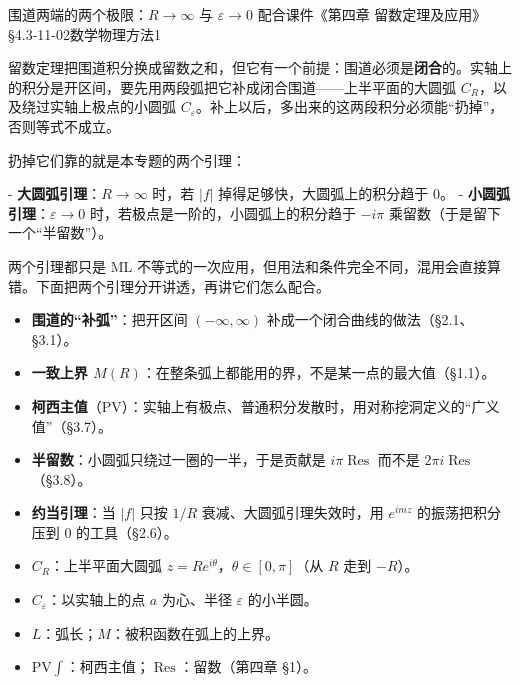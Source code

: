 \documentclass[11pt]{ctexart}
\let\origsubhdr\subhdr
\renewcommand{\subhdr}[1]{\par\needspace{4\baselineskip}\origsubhdr{#1}}
\let\orighdr\hdr
\renewcommand{\hdr}[2]{\par\orighdr{#1}{#2}}
\begin{document}
{围道两端的两个极限：$R\to\infty$ 与 $\varepsilon\to0$}
{配合课件《第四章 留数定理及应用》§4.3-11-02\quad 数学物理方法1}


留数定理把围道积分换成留数之和，但它有一个前提：围道必须是\textbf{闭合}的。实轴上的积分是开区间，要先用两段弧把它补成闭合围道——上半平面的大圆弧 $C_R$，以及绕过实轴上极点的小圆弧 $C_\varepsilon$。补上以后，多出来的这两段积分必须能“扔掉”，否则等式不成立。

扔掉它们靠的就是本专题的两个引理：

- \textbf{大圆弧引理}：$R\to\infty$ 时，若 $|f|$ 掉得足够快，大圆弧上的积分趋于 0。
- \textbf{小圆弧引理}：$\varepsilon\to0$ 时，若极点是一阶的，小圆弧上的积分趋于 $-i\pi$ 乘留数（于是留下一个“半留数”）。

两个引理都只是 ML 不等式的一次应用，但用法和条件完全不同，混用会直接算错。下面把两个引理分开讲透，再讲它们怎么配合。


\begin{itemize}
\item \textbf{围道的“补弧”}：把开区间 $(-\infty,\infty)$ 补成一个闭合曲线的做法（§2.1、§3.1）。
\item \textbf{一致上界 $M(R)$}：在整条弧上都能用的界，不是某一点的最大值（§1.1）。
\item \textbf{柯西主值}（$\mathrm{PV}$）：实轴上有极点、普通积分发散时，用对称挖洞定义的“广义值”（§3.7）。
\item \textbf{半留数}：小圆弧只绕过一圈的一半，于是贡献是 $i\pi\operatorname{Res}$ 而不是 $2\pi i\operatorname{Res}$（§3.8）。
\item \textbf{约当引理}：当 $|f|$ 只按 $1/R$ 衰减、大圆弧引理失效时，用 $e^{imz}$ 的振荡把积分压到 0 的工具（§2.6）。
\end{itemize}


\begin{itemize}
\item $C_R$：上半平面大圆弧 $z=Re^{i\theta}$，$\theta\in[0,\pi]$（从 $R$ 走到 $-R$）。
\item $C_\varepsilon$：以实轴上的点 $a$ 为心、半径 $\varepsilon$ 的小半圆。
\item $L$：弧长；$M$：被积函数在弧上的上界。
\item $\mathrm{PV}\!\int$：柯西主值；$\operatorname{Res}$：留数（第四章 §1）。
\end{itemize}
\end{document}
